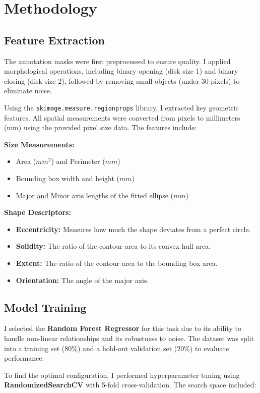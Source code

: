 \documentclass{IEEEtran}
\begin{document}
\section{Methodology}
\subsection{Feature Extraction}
The annotation masks were first preprocessed to ensure quality. I applied morphological operations, including binary opening (disk size 1) and binary closing (disk size 2), followed by removing small objects (under 30 pixels) to eliminate noise.

Using the \texttt{skimage.measure.regionprops} library, I extracted key geometric features. All spatial measurements were converted from pixels to millimeters (mm) using the provided pixel size data. The features include:

\textbf{Size Measurements:}
\begin{itemize}
    \item Area ($mm^2$) and Perimeter ($mm$)
    \item Bounding box width and height ($mm$)
    \item Major and Minor axis lengths of the fitted ellipse ($mm$)
\end{itemize}

\textbf{Shape Descriptors:}
\begin{itemize}
    \item \textbf{Eccentricity:} Measures how much the shape deviates from a perfect circle.
    \item \textbf{Solidity:} The ratio of the contour area to its convex hull area.
    \item \textbf{Extent:} The ratio of the contour area to the bounding box area.
    \item \textbf{Orientation:} The angle of the major axis.
\end{itemize}

\subsection{Model Training}
I selected the \textbf{Random Forest Regressor} for this task due to its ability to handle non-linear relationships and its robustness to noise. The dataset was split into a training set (80\%) and a hold-out validation set (20\%) to evaluate performance.

To find the optimal configuration, I performed hyperparameter tuning using \textbf{RandomizedSearchCV} with 5-fold cross-validation. The search space included:
\end{document}
